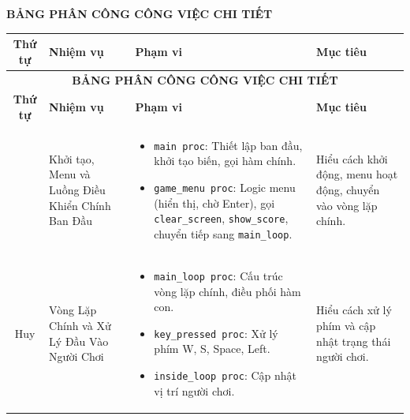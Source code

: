 \documentclass[12pt,a4paper,openany,oneside]{report}
\begin{document}
\newpage
\thispagestyle{empty}
\tableofcontents
\newpage


\listoffigures
{}
\newpage


\pagestyle{plain}
\fontsize{13pt}{13pt}\selectfont \baselineskip 0.75cm 

\begin{center}
    \Large \textbf{BẢNG PHÂN CÔNG CÔNG VIỆC CHI TIẾT}
\end{center}


\vspace{0.5cm} 

{\setlength{\LTpre}{0pt} 
 \setlength{\LTpost}{0pt} 


\begin{longtable}{c p{} >{\RaggedRight\arraybackslash\setlist[itemize]{leftmargin=*, topsep=0pt, partopsep=0pt, itemsep=1pt, parsep=1pt}}p{} p{}}

\toprule
\textbf{Thứ tự} & \textbf{Nhiệm vụ} & \textbf{Phạm vi} & \textbf{Mục tiêu} \\
\midrule
\endfirsthead

\multicolumn{4}{c}{{\bfseries BẢNG PHÂN CÔNG CÔNG VIỆC CHI TIẾT}} \\ 
\toprule
\textbf{Thứ tự} & \textbf{Nhiệm vụ} & \textbf{Phạm vi} & \textbf{Mục tiêu} \\
\midrule
\endhead


\endfoot

\bottomrule
\endlastfoot


\multirow{2}{*}{Khánh} 
  & Khởi tạo, Menu và Luồng Điều Khiển Chính Ban Đầu 
  & 
    \begin{itemize}
      \item \texttt{main proc}: Thiết lập ban đầu, khởi tạo biến, gọi hàm chính.
      \item \texttt{game\_menu proc}: Logic menu (hiển thị, chờ Enter), gọi \texttt{clear\_screen}, \texttt{show\_score}, chuyển tiếp sang \texttt{main\_loop}.
    \end{itemize}
  & Hiểu cách khởi động, menu hoạt động, chuyển vào vòng lặp chính. \\
\cmidrule{2-4} 

\multirow{3}{*}{Huy} 
  & Vòng Lặp Chính và Xử Lý Đầu Vào Người Chơi
  & 
    \begin{itemize}
      \item \texttt{main\_loop proc}: Cấu trúc vòng lặp chính, điều phối hàm con.
      \item \texttt{key\_pressed proc}: Xử lý phím W, S, Space, Left.
      \item \texttt{inside\_loop proc}: Cập nhật vị trí người chơi.
    \end{itemize}
  & Hiểu cách xử lý phím và cập nhật trạng thái người chơi. \\
\cmidrule{2-4}


\end{longtable}}
\end{document}

